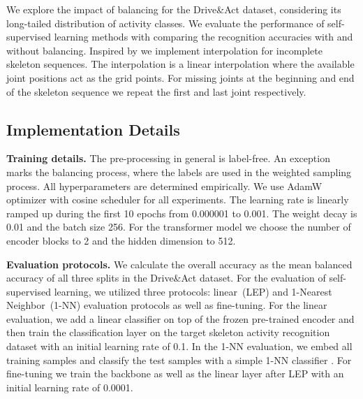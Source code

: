 We explore the impact of balancing for the Drive\&Act dataset, considering its long-tailed distribution of activity classes. We evaluate the performance of self-supervised learning methods with comparing the recognition accuracies with and without balancing. 
Inspired by \textcite{li2024incomplete} we implement interpolation for incomplete skeleton sequences. The interpolation is a linear interpolation where the available joint positions act as the grid points. For missing joints at the beginning and end of the skeleton sequence we repeat the first and last joint respectively.

\subsection{Implementation Details}


\textbf{Training details.} The pre-processing in general is label-free. An exception marks the balancing process, where the labels are used in the weighted sampling process. All hyperparameters are determined empirically. We use AdamW optimizer with cosine scheduler for all experiments. The learning rate is linearly ramped up during the first
10 epochs from 0.000001 to 0.001. The weight decay is 0.01 and the batch size 256. For the transformer model we choose the number of encoder blocks to 2 and the hidden dimension to 512.

\textbf{Evaluation protocols.} We calculate the overall accuracy as the mean balanced accuracy of all three splits in the Drive\&Act dataset. For the evaluation of self-supervised learning, we utilized three protocols: linear~(LEP) and 1-Nearest Neighbor~(1-NN) evaluation protocols as well as fine-tuning. For the linear evaluation, we add a linear classifier on top of the frozen pre-trained encoder and then train the classification layer on the target skeleton activity recognition dataset with an initial learning rate of 0.1. In the 1-NN evaluation, we embed all training samples and classify the test samples with a simple 1-NN classifier \cite{su2020predict}. For fine-tuning we train the backbone as well as the linear layer after LEP with an initial learning rate of 0.0001.

